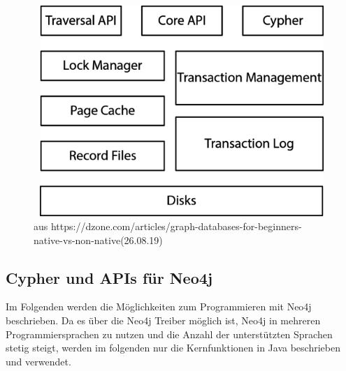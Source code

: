 \begin{figure}[H]
	\centering
	\includegraphics [width=12cm, height=8cm]{Figures/architecture}
	\caption[Architekur von Neo4j]{ aus https://dzone.com/articles/graph-databases-for-beginners-native-vs-non-native(26.08.19)}
	\label{fig:Architecure}
\end{figure}

\subsection{Cypher und APIs für Neo4j}
Im Folgenden werden die Möglichkeiten zum Programmieren mit Neo4j beschrieben. Da es über die Neo4j Treiber möglich ist, Neo4j in mehreren Programmiersprachen zu nutzen und die Anzahl der unterstützten Sprachen stetig steigt, werden im folgenden nur die Kernfunktionen in Java beschrieben und verwendet. 
